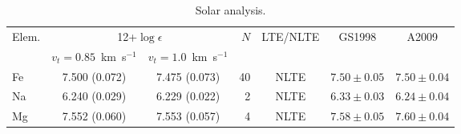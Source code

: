 \documentclass{aa}
\begin{document}
\begin{table*}
\caption{Solar analysis.}
\label{tab:sun}
\centering
\begin{tabular}{l c c r c c c}
\hline\hline
 Elem. & \multicolumn{2}{c}{12+$\log \epsilon$} & $N$ & LTE/NLTE & GS1998 & A2009 \\
 & $v_t=0.85$~km~s$^{-1}$ & $v_t=1.0$~km~s$^{-1}$ \\
\hline
Fe & 7.500 (0.072) & 7.475 (0.073) & 40 & NLTE & $7.50\pm0.05$ & $7.50\pm0.04$\\
Na & 6.240 (0.029) & 6.229 (0.022) &  2 & NLTE & $6.33\pm0.03$ & $6.24\pm0.04$\\
Mg & 7.552 (0.060) & 7.553 (0.057) &  4 & NLTE & $7.58\pm0.05$ & $7.60\pm0.04$\\

\end{tabular}
\end{table*}
\end{document}

